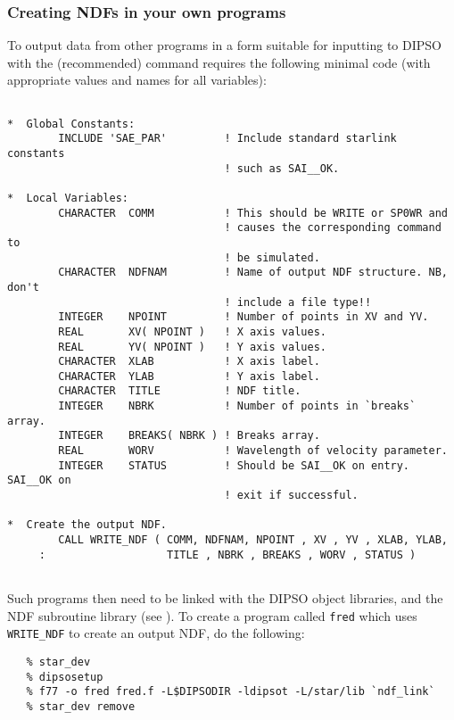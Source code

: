 \subsubsection{Creating NDFs in your own programs}

To output data from other programs in a form suitable for inputting to DIPSO
with the (recommended)   command requires the following minimal code (with
appropriate values and names for all variables):

\begin{small}
\begin{verbatim}

*  Global Constants:
        INCLUDE 'SAE_PAR'         ! Include standard starlink constants
                                  ! such as SAI__OK.

*  Local Variables:
        CHARACTER  COMM           ! This should be WRITE or SP0WR and
                                  ! causes the corresponding command to
                                  ! be simulated.
        CHARACTER  NDFNAM         ! Name of output NDF structure. NB, don't
                                  ! include a file type!!
        INTEGER    NPOINT         ! Number of points in XV and YV.
        REAL       XV( NPOINT )   ! X axis values.
        REAL       YV( NPOINT )   ! Y axis values.
        CHARACTER  XLAB           ! X axis label.
        CHARACTER  YLAB           ! Y axis label.
        CHARACTER  TITLE          ! NDF title.
        INTEGER    NBRK           ! Number of points in `breaks` array.
        INTEGER    BREAKS( NBRK ) ! Breaks array.
        REAL       WORV           ! Wavelength of velocity parameter.
        INTEGER    STATUS         ! Should be SAI__OK on entry. SAI__OK on 
                                  ! exit if successful.

*  Create the output NDF.	
        CALL WRITE_NDF ( COMM, NDFNAM, NPOINT , XV , YV , XLAB, YLAB,
     :                   TITLE , NBRK , BREAKS , WORV , STATUS )


\end{verbatim}
\end{small}

Such programs then need to be linked with the DIPSO object libraries, and
the NDF subroutine library (see ). To create a
program called {\tt fred} which uses {\tt WRITE\_NDF} to create an output
NDF, do the following:

\begin{verbatim}
   % star_dev
   % dipsosetup
   % f77 -o fred fred.f -L$DIPSODIR -ldipsot -L/star/lib `ndf_link`
   % star_dev remove
\end{verbatim}


